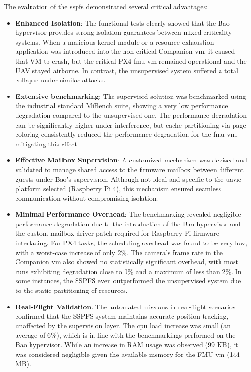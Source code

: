 The evaluation of the \gls{sspfs} demonstrated several critical
advantages:
\begin{itemize}
\item \textbf{Enhanced Isolation}: The functional tests clearly
  showed that the Bao hypervisor provides strong isolation guarantees between
  mixed-criticality systems. When a malicious kernel module or a resource
  exhaustion application was introduced into the non-critical Companion
  \gls{vm}, it caused that VM to crash, but the critical PX4 \gls{fmu} \gls{vm}
  remained operational and the UAV stayed airborne. In contrast, the
  unsupervised system suffered a total collapse under similar attacks.
\item \textbf{Extensive benchmarking}: The supervised solution was benchmarked
  using the industrial standard MiBench suite, showing a very low performance
  degradation compared to the unsupervised one. The performance degradation can
  be significantly higher under interference, but cache partitioning via page
  coloring consistently reduced the performance degradation for the \gls{fmu}
  \gls{vm}, mitigating this effect.
\item
\textbf{Effective Mailbox Supervision}: A
  customized mechanism was devised and validated to manage shared access to the
  firmware mailbox between different guests under Bao's supervision. Although
  not ideal and specific to the \gls{uavic} platform selected (Raspberry Pi 4),
  this mechanism ensured seamless communication without compromising isolation.
\item \textbf{Minimal Performance Overhead}: The benchmarking revealed negligible
  performance degradation due to the introduction of the Bao hypervisor and the
  custom mailbox driver patch required for Raspberry Pi firmware
  interfacing. For PX4 tasks, the scheduling overhead was found to be very low,
  with a worst-case increase of only 2\%. The camera's frame rate in the
  Companion \gls{vm} also showed no statistically significant overhead, with
  most runs exhibiting degradation close to 0\% and a maximum of less than
  2\%. In some instances, the SSPFS even outperformed the unsupervised system
  due to the static partitioning of resources.
\item \textbf{Real-Flight Validation}: The automated missions in real-flight scenarios confirmed that the
  SSPFS system maintains accurate position tracking, unaffected by the
  supervision layer. The \gls{cpu} load increase was small (an average of 6\%),
  which is in line with the benchmarkings performed on the Bao hypervisor.
  While an increase in RAM usage was observed (99 KB), it was
  considered negligible given the available memory for the FMU \gls{vm} (144
  MB).
\end{itemize}

